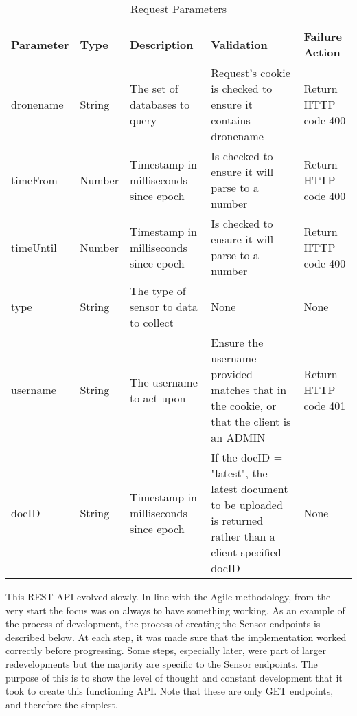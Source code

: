 \documentclass{article}
\begin{document}
\begin{table}[ht]
\caption{Request Parameters\label{tab:RequestParams}}
\centering
\renewcommand{\arraystretch}{1.5}
\begin{tabularx}{\textwidth}{>{\centering}p{1.5cm} >{\centering}p{1cm} >{\centering}p{3cm} p{5cm} X}
Parameter & Type & Description & Validation & Failure Action \\ [0.5ex]
\hline
dronename & String & The set of databases to query & Request's cookie is checked to ensure it contains dronename & Return HTTP code 400 \\
timeFrom  & Number & Timestamp in milliseconds since epoch  & Is checked to ensure it will parse to a number & Return HTTP code 400 \\
timeUntil & Number & Timestamp in milliseconds since epoch  & Is checked to ensure it will parse to a number & Return HTTP code 400 \\
type      & String & The type of sensor to data to collect & None & None \\
username  & String & The username to act upon & Ensure the username provided matches that in the cookie, or that the client is an ADMIN & Return HTTP code 401 \\ 
docID 	  & String & Timestamp in milliseconds since epoch & If the docID = "latest", the latest document to be uploaded is returned rather than a client specified docID & None \\ [1ex]
\hline
\end{tabularx}
\label{table:requestParams}
\end{table}

This REST API evolved slowly. In line with the Agile methodology, from the very start the focus was on always to have something working. As an example of the process of development, the process of creating the Sensor endpoints is described below. At each step, it was made sure that the implementation worked correctly before progressing. Some steps, especially later, were part of larger redevelopments but the majority are specific to the Sensor endpoints. The purpose of this is to show the level of thought and constant development that it took to create this functioning API. Note that these are only GET endpoints, and therefore the simplest.
\end{document}
